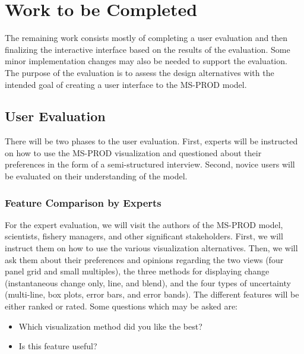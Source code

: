 \chapter{Work to be Completed}
The remaining work consists mostly of completing a user evaluation and then finalizing the interactive interface based on the results of the evaluation. Some minor implementation changes may also be needed to support the evaluation.  The purpose of the evaluation is to assess the design alternatives with the intended goal of creating a user interface to the MS-PROD model.%

\section{User Evaluation}

There will be two phases to the user evaluation.  First, experts will be instructed on how to use the MS-PROD visualization and questioned about their preferences in the form of a semi-structured interview.  Second, novice users will be evaluated on their understanding of the model.

\subsection{Feature Comparison by Experts}

For the expert evaluation, we will visit the authors of the MS-PROD model, scientists, fishery managers, and other significant stakeholders.  First, we will instruct them on how to use the various visualization alternatives.  Then, we will ask them about their preferences and opinions regarding the two views (four panel grid and small multiples), the three methods for displaying change (instantaneous change only, line, and blend), and the four types of uncertainty (multi-line, box plots, error bars, and error bands).  The different features will be either ranked or rated.  Some questions which may be asked are:

\begin{itemize}
  \item Which visualization method did you like the best?
  \item Is this feature useful?
\end{itemize}

